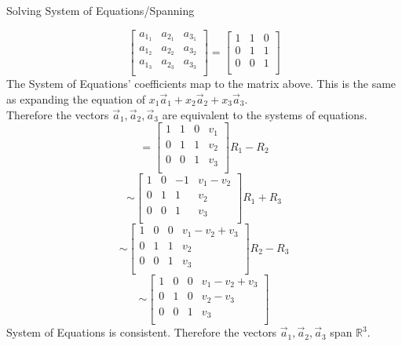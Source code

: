 \documentclass[12pt]{article}
\newcommand{\sqbrl}{\left[}
\newcommand{\sqbrr}{\right]}
\newenvironment{problem}[2][Problem]{\begin{trivlist}
\item[\hskip \labelsep {\bfseries #1}\hskip \labelsep {\bfseries #2.}]}{\end{trivlist}}
\begin{document}
\begin{problem}{6}
	Solving System of Equations/Spanning
\end{problem}
	\[\sqbrl\begin{matrix}
		a_{1_1} & a_{2_1} & a_{3_1}\\
		a_{1_2} & a_{2_2} & a_{3_2}\\
		a_{1_3} & a_{2_3} & a_{3_3}\\
	\end{matrix}\sqbrr
	= \sqbrl\begin{matrix}
		1 & 1 & 0\\
		0 & 1 & 1\\
		0 & 0 & 1\\
		\end{matrix}\sqbrr		
	\]
The System of Equations' coefficients map to the matrix above. This is the same as expanding the equation of 
$x_1 \vec{a}_1 + x_2 \vec{a}_2 + x_3 \vec{a}_3$.\\
Therefore the vectors $\vec a_1,  \vec a_2,  \vec a_3$ are equivalent to the systems of equations.\\
	\[=
		\left[
		\begin{array}{ccc|c}
		1 & 1 & 0 & v_1\\
		0 & 1 & 1 & v_2\\
		0 & 0 & 1 & v_3\\
		\end{array}
		\right] R_1 - R_2
	\]
	\[\sim
		\left[
		\begin{array}{ccc|c}
		1 & 0 & -1 & v_1 - v_2\\
		0 & 1 & 1 & v_2\\
		0 & 0 & 1 & v_3\\
		\end{array}
		\right] R_1 + R_3
	\]
	\[\sim
		\left[
		\begin{array}{ccc|c}
		1 & 0 & 0 & v_1 - v_2 + v_3\\
		0 & 1 & 1 & v_2\\
		0 & 0 & 1 & v_3\\
		\end{array}
		\right] R_2 - R_3
	\]
	\[\sim
		\left[
		\begin{array}{ccc|c}
		1 & 0 & 0 & v_1 - v_2 + v_3\\
		0 & 1 & 0 & v_2 - v_3\\
		0 & 0 & 1 & v_3\\
		\end{array}
		\right]
	\]
System of Equations is consistent. Therefore the vectors $\vec a_1,  \vec a_2,  \vec a_3$ span $\mathds{R}^3$.
\end{document}
